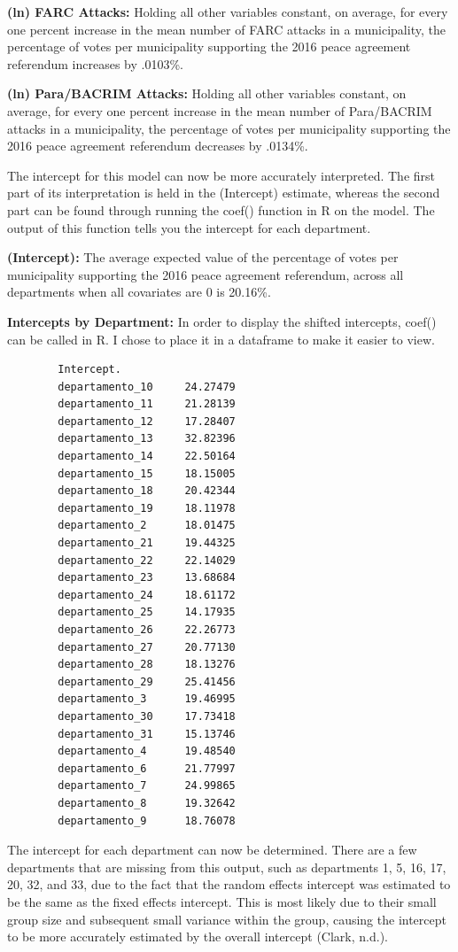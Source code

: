 \documentclass[12pt,letterpaper]{article}
\begin{document}
	\textbf{(ln) FARC Attacks:} Holding all other variables constant, on average, for every one percent increase in the mean number of FARC attacks in a municipality, the percentage of votes per municipality supporting the 2016 peace agreement referendum increases by .0103\%.

	\textbf{(ln) Para/BACRIM Attacks:} Holding all other variables constant, on average, for every one percent increase in the mean number of Para/BACRIM attacks in a municipality, the percentage of votes per municipality supporting the 2016 peace agreement referendum decreases by .0134\%.
	
	The intercept for this model can now be more accurately interpreted. The first part of its interpretation is held in the (Intercept) estimate, whereas the second part can be found  through running the coef() function in R on the model. The output of this function tells you the intercept for each department.
	
	\textbf{(Intercept):} The average expected value of the percentage of votes per municipality supporting the 2016 peace agreement referendum, across all departments when all covariates are 0 is 20.16\%.
	
	\textbf{Intercepts by Department:} In order to display the shifted intercepts, coef() can be called in R. I chose to place it in a dataframe to make it easier to view.
	
	
	\begin{verbatim}
		Intercept.
		departamento_10     24.27479
		departamento_11     21.28139
		departamento_12     17.28407
		departamento_13     32.82396
		departamento_14     22.50164
		departamento_15     18.15005
		departamento_18     20.42344
		departamento_19     18.11978
		departamento_2      18.01475
		departamento_21     19.44325
		departamento_22     22.14029
		departamento_23     13.68684
		departamento_24     18.61172
		departamento_25     14.17935
		departamento_26     22.26773
		departamento_27     20.77130
		departamento_28     18.13276
		departamento_29     25.41456
		departamento_3      19.46995
		departamento_30     17.73418
		departamento_31     15.13746
		departamento_4      19.48540
		departamento_6      21.77997
		departamento_7      24.99865
		departamento_8      19.32642
		departamento_9      18.76078
	\end{verbatim}
	The intercept for each department can now be determined. There are a few departments that are missing from this output, such as departments 1, 5, 16, 17, 20, 32, and 33, due to the fact that the random effects intercept was estimated to be the same as the fixed effects intercept. This is most likely due to their small group size and subsequent small variance within the group, causing the intercept to be more accurately estimated by the overall intercept (Clark, n.d.). 
	
\end{document}
